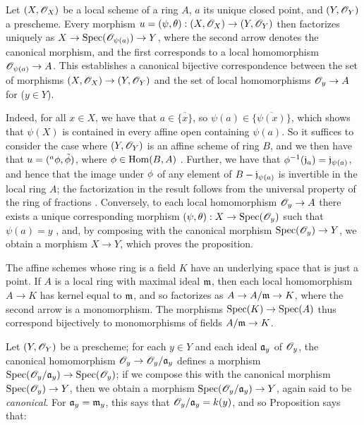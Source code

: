 \begin{prop}[2.4.4]
\label{1.2.4.4}
Let $(X,\mathscr{O}_X)$ be a local scheme of a ring
$A$, $a$ its unique closed point, and $(Y,\mathscr{O}_Y)$ a prescheme. Every morphism
$u=(\psi,\theta):(X,\mathscr{O}_X)\to(Y,\mathscr{O}_Y)$ then factorizes uniquely as
$X\to{\mathop{\mathrm{Spec}}\nolimits}(\mathscr{O}_{\psi(a)})\to Y$, where the second arrow denotes the canonical
morphism, and the first corresponds to a local homomorphism $\mathscr{O}_{\psi(a)}\to A$.
This establishes a canonical bijective correspondence between the set of
morphisms $(X,\mathscr{O}_X)\to(Y,\mathscr{O}_Y)$ and the set of local homomorphisms $\mathscr{O}_y\to A$
for ($y\in Y$).
\end{prop}

Indeed, for all $x\in X$, we have that $a\in\overline{\{x\}}$, so
$\psi(a)\in\overline{\{\psi(x)\}}$, which shows that $\psi(X)$ is contained in
every affine open containing $\psi(a)$. So it suffices to consider the case
where $(Y,\mathscr{O}_Y)$ is an affine scheme of ring $B$, and we then have that
$u=({}^a\phi,\tilde{\phi})$, where $\phi\in{\mathop{\mathrm{Hom}}\nolimits}(B,A)$ . Further,
we have that $\phi^{-1}(\mathfrak{j}_a)=\mathfrak{j}_{\psi(a)}$, and hence
that the image under $\phi$ of any element of
$B-\mathfrak{j}_{\psi(a)}$ is invertible in the local ring $A$; the
factorization in the result follows from the universal property of the ring of
fractions . Conversely, to each local homomorphism
$\mathscr{O}_y\to A$ there exists a unique corresponding morphism
$(\psi,\theta):X\to{\mathop{\mathrm{Spec}}\nolimits}(\mathscr{O}_y)$ such that $\psi(a)=y$ , and,
by composing with the canonical morphism ${\mathop{\mathrm{Spec}}\nolimits}(\mathscr{O}_y)\to Y$, we obtain a morphism
$X\to Y$, which proves the proposition.

\begin{env}[2.4.5]
\label{1.2.4.5}
The affine schemes whose ring is a field $K$ have an
underlying space that is just a point. If $A$ is a local ring with maximal
ideal $\mathfrak{m}$, then each local homomorphism $A\to K$ has kernel equal to
$\mathfrak{m}$, and so factorizes as $A\to A/\mathfrak{m}\to K$, where the
second arrow is a monomorphism. The morphisms ${\mathop{\mathrm{Spec}}\nolimits}(K)\to{\mathop{\mathrm{Spec}}\nolimits}(A)$ thus
correspond bijectively to monomorphisms of fields $A/\mathfrak{m}\to K$.
\end{env}

Let $(Y,\mathscr{O}_Y)$ be a prescheme; for each $y\in Y$ and each ideal
$\mathfrak{a}_y$ of $\mathscr{O}_y$, the canonical homomorphism
$\mathscr{O}_y\to\mathscr{O}_y/\mathfrak{a}_y$ defines a morphism
${\mathop{\mathrm{Spec}}\nolimits}(\mathscr{O}_y/\mathfrak{a}_y)\to{\mathop{\mathrm{Spec}}\nolimits}(\mathscr{O}_y)$; if we compose this with the
canonical morphism ${\mathop{\mathrm{Spec}}\nolimits}(\mathscr{O}_y)\to Y$, then we obtain a morphism
${\mathop{\mathrm{Spec}}\nolimits}(\mathscr{O}_y/\mathfrak{a}_y)\to Y$, again said to be \textit{canonical}. For
$\mathfrak{a}_y=\mathfrak{m}_y$, this says that $\mathscr{O}_y/\mathfrak{a}_y=k(y)$, and
so Proposition  says that:

